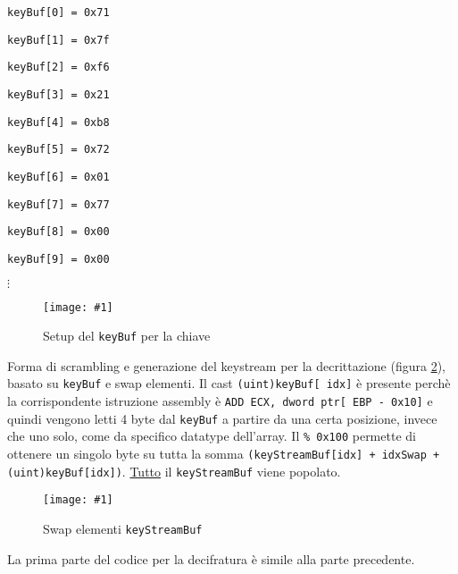 \documentclass[
    a4paper, %
    11pt %
]{article}
\newcommand{\pic}[4]{\begin{figure}[H]
            \centering
            \texttt{[image: \#1]}
            \caption{#2}
            \label{fig:#1}
            \end{figure}}
\begin{document}
            \begin{center}
            \texttt{keyBuf[0] = 0x71}
            
            \texttt{keyBuf[1] = 0x7f}
            
            \texttt{keyBuf[2] = 0xf6}
            
            \texttt{keyBuf[3] = 0x21}
            
            \texttt{keyBuf[4] = 0xb8}
            
            \texttt{keyBuf[5] = 0x72}
            
            \texttt{keyBuf[6] = 0x01}
            
            \texttt{keyBuf[7] = 0x77}

            \texttt{keyBuf[8] = 0x00}

            \texttt{keyBuf[9] = 0x00}
            
            $\vdots$
            
            \end{center}
            
            \pic{dec_key_setup_new}{Setup del \texttt{keyBuf} per la chiave}{12cm}{5cm}

            \pagebreak
            
            Forma di scrambling e generazione del keystream per la decrittazione (figura \ref{fig:dec_key_swap_new}), basato su 
            \texttt{keyBuf} e swap elementi. Il cast \texttt{(uint)keyBuf[\textunderscore 
            idx]}
            è presente perchè la corrispondente istruzione assembly è
            \texttt{ADD ECX, dword ptr[ EBP - 0x10]} e quindi vengono letti 4 byte dal \texttt{keyBuf}
            a partire da una certa posizione, invece che uno solo, come da specifico datatype dell'array. 
            Il \texttt{\% 0x100} permette di ottenere un singolo byte
            su tutta la somma \texttt{(keyStreamBuf[\textunderscore idx] + 
            \textunderscore idxSwap + (uint)keyBuf[\textunderscore idx])}.
            \underline{Tutto} il \texttt{keyStreamBuf} viene popolato.
            
            \pic{dec_key_swap_new}{Swap elementi \texttt{keyStreamBuf}}{13cm}{3cm}

            La prima parte del codice per la decifratura è simile alla parte precedente.
            
\end{document}
